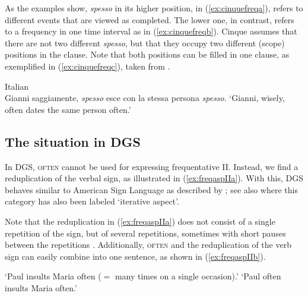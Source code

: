 \noindent As the examples show, \textit{spesso} in its higher position, in (\ref{ex:cinquefreqa}), refers to different events that are viewed as completed. The lower one, in contrast, refers to a frequency in one time interval as in (\ref{ex:cinquefreqb}). Cinque assumes that there are not two different \textit{spesso}, but that they occupy two different (scope) positions in the clause. Note that both positions can be filled in one clause, as exemplified in (\ref{ex:cinquefreqc}), taken from \citet[92]{cinque1999adverbs}.

\begin{exe}

\ex Italian \citep[92]{cinque1999adverbs} \\ {Gianni saggiamente, \textit{spesso} esce con la stessa persona \textit{spesso}.}
\glt `Gianni, wisely, often dates the same person often.' \label{ex:cinquefreqc}

\end{exe}


\subsection{The situation in DGS}
\noindent In DGS, \textsc{often} cannot be used for expressing frequentative II. Instead, we find a reduplication of the verbal sign, as illustrated in (\ref{ex:freqaspIIa}). With this, DGS behaves similar to American Sign Language as described by \citet{klima1979signs,rathmann2005event}; see also \citet{pfausteinbwol2012tense} where this category has also been labeled `iterative aspect'.

Note that the reduplication in (\ref{ex:freqaspIIa}) does not consist of a single repetition of the sign, but of several repetitions, sometimes with short pauses between the repetitions \citep[163]{papaspyrou2008grammatik}. Additionally, \textsc{often} and the reduplication of the verb sign can easily combine into one sentence, as shown in (\ref{ex:freqaspIIb}).


\begin{exe}
\ex\label{frequecsaca}\begin{xlist}
\glt `Paul insults Maria often ($=$ many times on a single occasion).' \label{ex:freqaspIIa}
\glt `Paul often insults Maria often.' \label{ex:freqaspIIb}
\end{xlist}
\end{exe}

